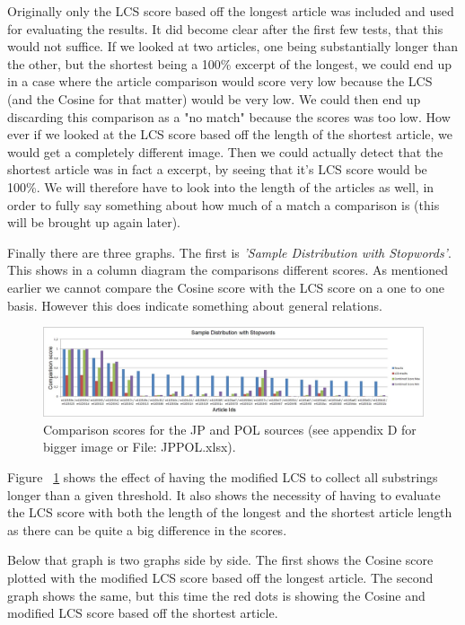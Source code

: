 Originally only the LCS score based off the longest article was included and used for evaluating the results. It did become clear after the first few tests, that this would not suffice. If we looked at two articles, one being substantially longer than the other, but the shortest being a 100\% excerpt of the longest, we could end up in a case where the article comparison would score very low because the LCS (and the Cosine for that matter) would be very low. We could then end up discarding this comparison as a "no match" because the scores was too low. How ever if we looked at the LCS score based off the length of the shortest article, we would get a completely different image. Then we could actually detect that the shortest article was in fact a excerpt, by seeing that it's LCS score would be 100\%. We will therefore have to look into the length of the articles as well, in order to fully say something about how much of a match a comparison is (this will be brought up again later).

Finally there are three graphs. The first is \textit{'Sample Distribution with Stopwords'}. This shows in a column diagram the comparisons different scores. As mentioned earlier we cannot compare the Cosine score with the LCS score on a one to one basis. However this does indicate something about general relations.

\begin{figure}
	\centering
	\includegraphics[scale=0.25]{figures/JPPOLScoreGraph}
	\caption{Comparison scores for the JP and POL sources (see appendix D for bigger image or File: JPPOL.xlsx).}
	\label{JPPOLScoreGraph}
\end{figure}

Figure ~\ref{JPPOLScoreGraph} shows the effect of having the modified LCS to collect all substrings longer than a given threshold. It also shows the necessity of having to evaluate the LCS score with both the length of the longest and the shortest article length as there can be quite a big difference in the scores.

Below that graph is two graphs side by side. The first shows the Cosine score plotted with the modified LCS score based off the longest article. The second graph shows the same, but this time the red dots is showing the Cosine and modified LCS score based off the shortest article.

